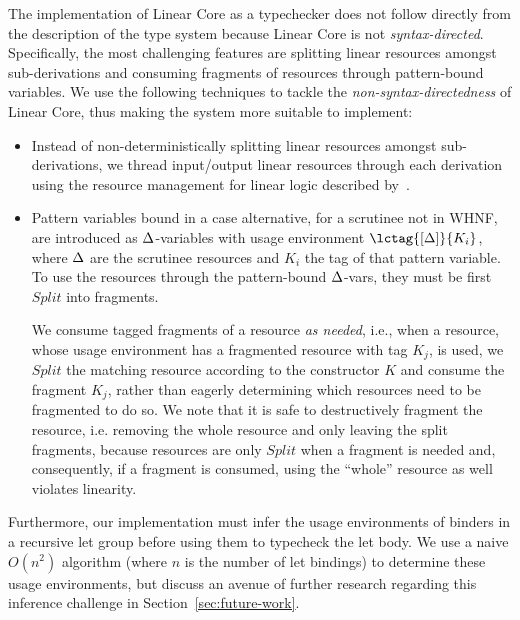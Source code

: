 \documentclass[acmsmall,review]{acmart}
\begin{document}
The implementation of Linear Core as a typechecker does not follow directly
from the description of the type system because Linear Core is not
\emph{syntax-directed}. Specifically, the most challenging features are
splitting linear resources amongst sub-derivations and consuming fragments of
resources through pattern-bound variables.
%
We use the following techniques to tackle the \emph{non-syntax-directedness} of
Linear Core, thus making the system more suitable to implement:
%
\begin{itemize}

\item Instead of non-deterministically splitting linear resources amongst
sub-derivations, we thread input/output linear resources through each
derivation using the resource management for linear logic described
by~\cite{DBLP:journals/tcs/CervesatoHP00}.

\item Pattern variables bound in a case alternative, for a scrutinee not in WHNF,
are introduced as $\Delta$-variables with usage environment $\lctag{\irr{\D}}{K_i}$,
where $\Delta$ are the scrutinee resources and $K_i$ the tag of that pattern
variable. To use the resources through the pattern-bound $\Delta$-vars, they must
be first $Split$ into fragments.

We consume tagged fragments of a resource \emph{as needed}, i.e., when a resource,
whose usage environment has a fragmented resource with tag $K_j$, is used, we $Split$
the matching resource according to the constructor $K$ and consume the fragment
$K_j$, rather than eagerly determining which resources need to be fragmented to
do so.
%
We note that it is safe to destructively fragment the resource, i.e. removing
the whole resource and only leaving the split fragments, because resources are
only $Split$ when a fragment is needed and, consequently, if a fragment is
consumed, using the ``whole'' resource as well violates linearity.

\end{itemize}
%
Furthermore, our implementation must infer the usage environments of binders in
a recursive let group before using them to typecheck the let body. We use a
naive $O(n^2)$ algorithm (where $n$ is the number of let bindings) to determine
these usage environments, but discuss an avenue of further research regarding
this inference challenge in Section~\ref{sec:future-work}.
\end{document}
